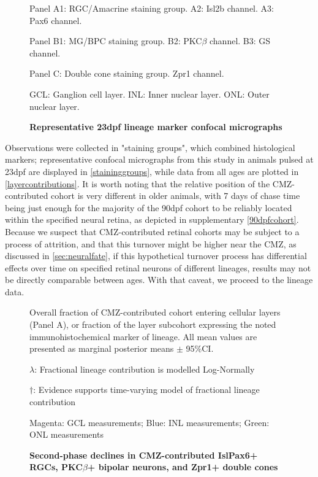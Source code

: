 \begin{figure}[!h]
    \caption{{\bf Representative 23dpf lineage marker confocal micrographs}}
    Panel A1: RGC/Amacrine staining group. A2: Isl2b channel. A3: Pax6 channel.

    Panel B1: MG/BPC staining group. B2: PKC$\beta$ channel. B3: GS channel.

    Panel C: Double cone staining group. Zpr1 channel.

    GCL: Ganglion cell layer. INL: Inner nuclear layer. ONL: Outer nuclear layer.
    \label{staininggroups}
\end{figure}

Observations were collected in "staining groups", which combined histological markers; representative confocal micrographs from this study in animals pulsed at 23dpf are displayed in \autoref{staininggroups}, while data from all ages are plotted in \autoref{layercontributions}. It is worth noting that the relative position of the CMZ-contributed cohort is very different in older animals, with 7 days of chase time being just enough for the majority of the 90dpf cohort to be reliably located within the specified neural retina, as depicted in supplementary \autoref{90dpfcohort}. Because we suspect that CMZ-contributed retinal cohorts may be subject to a process of attrition, and that this turnover might be higher near the CMZ, as discussed in \autoref{sec:neuralfate}, if this hypothetical turnover process has differential effects over time on specified retinal neurons of different lineages, results may not be directly comparable between ages. With that caveat, we proceed to the lineage data.

\begin{figure}[!h]
    \caption{{\bf Second-phase declines in CMZ-contributed Isl\/Pax6+ RGCs, PKC$\beta$+ bipolar neurons, and Zpr1+ double cones}}
    Overall fraction of CMZ-contributed cohort entering cellular layers (Panel A), or fraction of the layer subcohort expressing the noted immunohistochemical marker of lineage. All mean values are presented as marginal posterior means $\pm$ 95\%CI.

    $\lambda$: Fractional lineage contribution is modelled Log-Normally

    $\dagger$: Evidence supports time-varying model of fractional lineage contribution

    Magenta: GCL measurements; Blue: INL measurements; Green: ONL measurements
    \label{layercontributions}
\end{figure}

